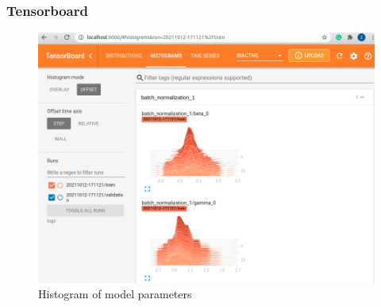 \documentclass{beamer}
\begin{document}
\begin{frame}
	\frametitle{Tensorboard}
	\begin{center}
		\begin{figure}
        \includegraphics[width=0.8\linewidth]{./src/figures/10_4.png}
        \caption{Histogram of model parameters}
		\end{figure}
	\end{center}
\end{frame}
\end{document}
